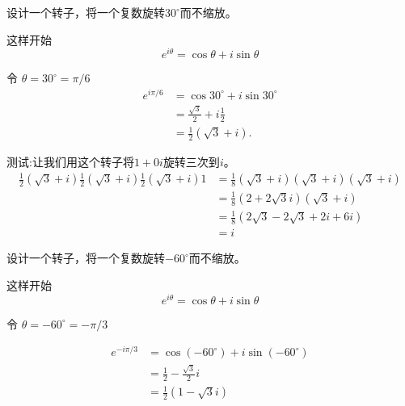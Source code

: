 \begin{example}
    设计一个转子，将一个复数旋转$30^{\circ}$而不缩放。
    
    这样开始
    $$
    e^{i \theta}=\cos \theta+i \sin \theta
    $$
    
    令 $\theta=30^{\circ}=\pi / 6$
    $$
    \begin{aligned}
    e^{i \pi / 6} & =\cos 30^{\circ}+i \sin 30^{\circ} \\
    & =\frac{\sqrt{3}}{2}+i \frac{1}{2} \\
    & =\frac{1}{2}(\sqrt{3}+i) .
    \end{aligned}
    $$
    
    测试:让我们用这个转子将$1+0 i$旋转三次到$i$。
    $$
    \begin{aligned}
    \frac{1}{2}(\sqrt{3}+i) \frac{1}{2}(\sqrt{3}+i) \frac{1}{2}(\sqrt{3}+i) 1 & =\frac{1}{8}(\sqrt{3}+i)(\sqrt{3}+i)(\sqrt{3}+i) \\
    & =\frac{1}{8}(2+2 \sqrt{3} i)(\sqrt{3}+i) \\
    & =\frac{1}{8}(2 \sqrt{3}-2 \sqrt{3}+2 i+6 i) \\
    & =i
    \end{aligned}
    $$
\end{example}

\begin{example}
    设计一个转子，将一个复数旋转$-60^{\circ}$而不缩放。
    
    这样开始
    $$
    e^{i \theta}=\cos \theta+i \sin \theta
    $$
    
    令 $\theta=-60^{\circ}=-\pi / 3$
    
    $$
    \begin{aligned}
    e^{-i \pi / 3} & =\cos \left(-60^{\circ}\right)+i \sin \left(-60^{\circ}\right) \\
    & =\frac{1}{2}-\frac{\sqrt{3}}{2} i \\
    & =\frac{1}{2}(1-\sqrt{3} i)
    \end{aligned}
    $$
\end{example}
